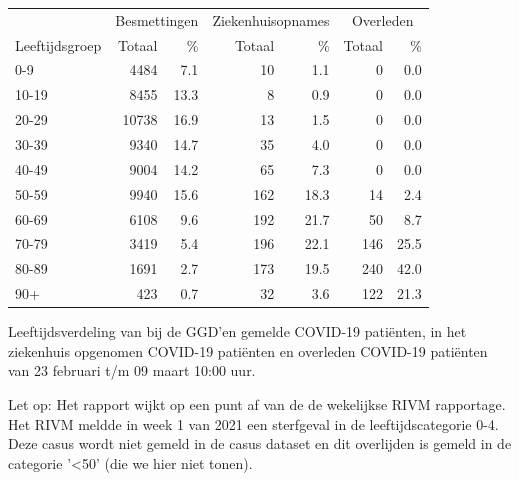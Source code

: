 \documentclass[
  english,
  man,floatsintext]{apa6}
\begin{document}
\begin{table}
\centering\begingroup\fontsize{11}{13}\selectfont

\begin{threeparttable}
\begin{tabular}{lrrrrrr}
\toprule
\multicolumn{1}{c}{ } & \multicolumn{2}{c}{Besmettingen} & \multicolumn{2}{c}{Ziekenhuisopnames} & \multicolumn{2}{c}{Overleden} \\
\cmidrule(l{3pt}r{3pt}){2-3} \cmidrule(l{3pt}r{3pt}){4-5} \cmidrule(l{3pt}r{3pt}){6-7}
Leeftijdsgroep & Totaal & \% & Totaal & \% & Totaal & \%\\
\midrule
0-9 & 4484 & 7.1 & 10 & 1.1 & 0 & 0.0\\
10-19 & 8455 & 13.3 & 8 & 0.9 & 0 & 0.0\\
20-29 & 10738 & 16.9 & 13 & 1.5 & 0 & 0.0\\
30-39 & 9340 & 14.7 & 35 & 4.0 & 0 & 0.0\\
40-49 & 9004 & 14.2 & 65 & 7.3 & 0 & 0.0\\
50-59 & 9940 & 15.6 & 162 & 18.3 & 14 & 2.4\\
60-69 & 6108 & 9.6 & 192 & 21.7 & 50 & 8.7\\
70-79 & 3419 & 5.4 & 196 & 22.1 & 146 & 25.5\\
80-89 & 1691 & 2.7 & 173 & 19.5 & 240 & 42.0\\
90+ & 423 & 0.7 & 32 & 3.6 & 122 & 21.3\\
\bottomrule
\end{tabular}
\begin{tablenotes}
\item[1] Leeftijdsverdeling van bij de GGD’en gemelde COVID-19 patiënten, in het ziekenhuis opgenomen COVID-19 patiënten en overleden COVID-19 patiënten van 23 februari t/m 09 maart 10:00 uur.
\item[2] Let op: Het rapport wijkt op een punt af van de de wekelijkse RIVM rapportage. Het RIVM meldde in week 1 van 2021 een sterfgeval in de leeftijdscategorie 0-4. Deze casus wordt niet gemeld in de casus dataset en dit overlijden is gemeld in de categorie '<50' (die we hier niet tonen).
\end{tablenotes}
\end{threeparttable}
\endgroup{}
\end{table}

\newpage
\end{document}
